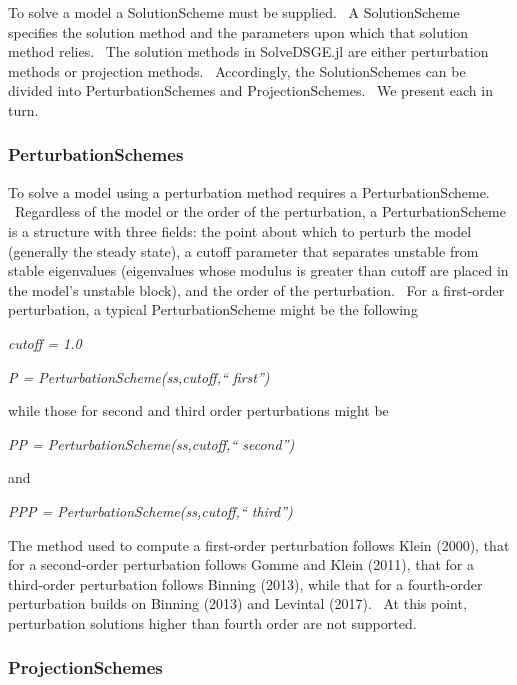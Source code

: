 \documentclass[notitlepage,11pt]{article}
\begin{document}
To solve a model a SolutionScheme must be supplied. \ A SolutionScheme
specifies the solution method and the parameters upon which that solution
method relies. \ The solution methods in SolveDSGE.jl are either
perturbation methods or projection methods. \ Accordingly, the
SolutionSchemes can be divided into PerturbationSchemes and
ProjectionSchemes. \ We present each in turn.

\subsubsection{PerturbationSchemes}

To solve a model using a perturbation method requires a PerturbationScheme.
\ Regardless of the model or the order of the perturbation, a
PerturbationScheme is a structure with three fields: the point about which
to perturb the model (generally the steady state), a cutoff parameter that
separates unstable from stable eigenvalues (eigenvalues whose modulus is
greater than cutoff are placed in the model's unstable block), and the order
of the perturbation. \ For a first-order perturbation, a typical
PerturbationScheme might be the following

\bigskip

\textit{cutoff = 1.0}

\textit{P = PerturbationScheme(ss,cutoff,\textquotedblleft
first\textquotedblright )}

\bigskip

while those for second and third order perturbations might be

\bigskip

\textit{PP = PerturbationScheme(ss,cutoff,\textquotedblleft
second\textquotedblright )}

\bigskip

and

\bigskip

\textit{PPP = PerturbationScheme(ss,cutoff,\textquotedblleft
third\textquotedblright )}

\bigskip

The method used to compute a first-order perturbation follows Klein (2000),
that for a second-order perturbation follows Gomme and Klein (2011), that
for a third-order perturbation follows Binning (2013), while that for a
fourth-order perturbation builds on Binning (2013) and Levintal (2017). \ At
this point, perturbation solutions higher than fourth order are not
supported.

\subsubsection{ProjectionSchemes}
\end{document}
